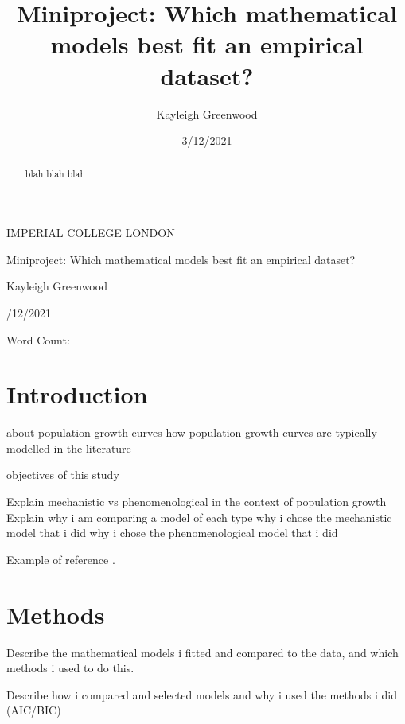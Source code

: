 \documentclass[11pt, titlepage]{article}
\title{Miniproject: Which mathematical models best fit an empirical dataset?}
\author{Kayleigh Greenwood}
\date{3/12/2021}
\newcommand{\wordcount}{}
\begin{document}
    \begin{titlepage}
    \begin{center}
            {\large IMPERIAL COLLEGE LONDON}
    \end{center}
    
    \vspace*{\fill}
    
    \begin{center}
        {\Huge Miniproject: Which mathematical models best fit an empirical dataset?}
    
        \bigskip
        Kayleigh Greenwood

        /12/2021

        \bigskip
        Word Count:
        \wordcount

    \end{center}
    
    \vspace{\fill}
    
    \end{titlepage}

    \begin{abstract}
    blah blah blah
    \end{abstract}

    \section*{Introduction}
    
    about population growth curves
    how population growth curves are typically modelled in the literature

    objectives of this study

    Explain mechanistic vs phenomenological in the context of population growth
    Explain why i am comparing a model of each type
    why i chose the mechanistic model that i did
    why i chose the phenomenological model that i did




    Example of reference \cite{verhulst1838notice}.


    \section*{Methods}

        Describe the mathematical models i fitted and compared to the data, and which methods i used to do this.

        Describe how i compared and selected models and why i used the methods i did (AIC/BIC)
\end{document}
